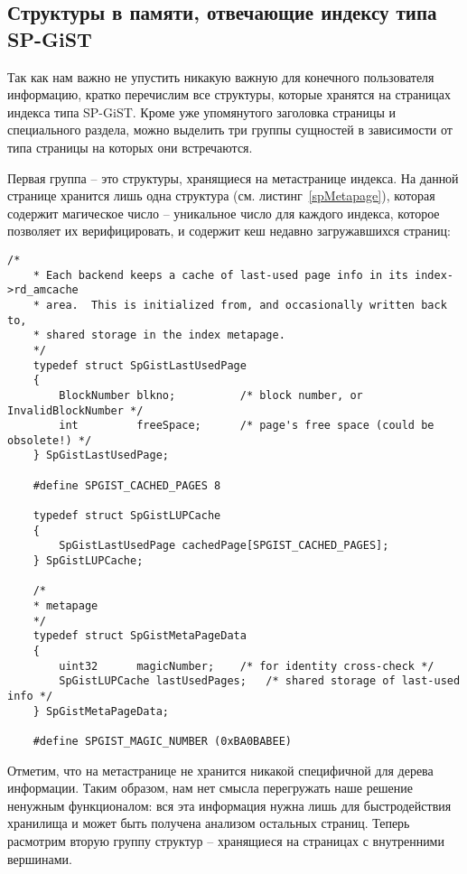 \documentclass[12pt,oneside]{amsart}
\begin{document}
\subsection{Структуры в памяти, отвечающие индексу типа SP-GiST}

Так как нам важно не упустить никакую важную для конечного пользователя информацию, кратко перечислим все структуры, которые хранятся на страницах индекса типа SP-GiST. Кроме уже упомянутого заголовка страницы и специального раздела, можно выделить три группы сущностей в зависимости от типа страницы на которых они встречаются.

Первая группа -- это структуры, хранящиеся на метастранице индекса. На данной странице хранится лишь одна структура (см. листинг~\ref{spMetapage}), которая содержит магическое число -- уникальное число для каждого индекса, которое позволяет их верифицировать, и содержит кеш недавно загружавшихся страниц:

\begin{center}
\begin{lstlisting}/*
	* Each backend keeps a cache of last-used page info in its index->rd_amcache
	* area.  This is initialized from, and occasionally written back to,
	* shared storage in the index metapage.
	*/
	typedef struct SpGistLastUsedPage
	{
		BlockNumber blkno;			/* block number, or InvalidBlockNumber */
		int			freeSpace;		/* page's free space (could be obsolete!) */
	} SpGistLastUsedPage;

	#define SPGIST_CACHED_PAGES 8

	typedef struct SpGistLUPCache
	{
		SpGistLastUsedPage cachedPage[SPGIST_CACHED_PAGES];
	} SpGistLUPCache;

	/*
	* metapage
	*/
	typedef struct SpGistMetaPageData
	{
		uint32		magicNumber;	/* for identity cross-check */
		SpGistLUPCache lastUsedPages;	/* shared storage of last-used info */
	} SpGistMetaPageData;

	#define SPGIST_MAGIC_NUMBER (0xBA0BABEE)
\end{lstlisting}
\label{spMetapage}
\end{center}

Отметим, что на метастранице не хранится никакой специфичной для дерева информации. Таким образом, нам нет смысла перегружать наше решение ненужным функционалом: вся эта информация нужна лишь для быстродействия хранилища и может быть получена анализом остальных страниц. Теперь расмотрим вторую группу структур -- хранящиеся на страницах с внутренними вершинами.
\end{document}
